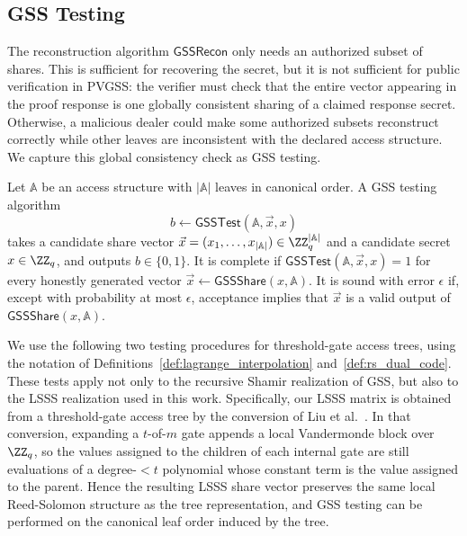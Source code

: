 \documentclass[runningheads]{llncs}
\newcommand{\gssshare}{\mathsf{GSSShare}}
\newcommand{\gssrecon}{\mathsf{GSSRecon}}
\newcommand{\gsstest}{\mathsf{GSSTest}}
\begin{document}



\subsection{GSS Testing}
The reconstruction algorithm \(\gssrecon\) only needs an authorized subset of shares. This is sufficient for recovering the secret, but it is not sufficient for public verification in PVGSS: the verifier must check that the entire vector appearing in the proof response is one globally consistent sharing of a claimed response secret. Otherwise, a malicious dealer could make some authorized subsets reconstruct correctly while other leaves are inconsistent with the declared access structure. We capture this global consistency check as GSS testing.

\begin{definition}\label{def:gss_testing}
Let \(\mathbb{A}\) be an access structure with \(|\mathbb{A}|\) leaves in canonical order. A GSS testing algorithm
\[
    b\gets \gsstest(\mathbb{A},\vec{x},x)
\]
takes a candidate share vector \(\vec{x}=(x_1,\ldots,x_{|\mathbb{A}|})\in \ZZ_q^{|\mathbb{A}|}\) and a candidate secret \(x\in\ZZ_q\), and outputs \(b\in\{0,1\}\). It is complete if \(\gsstest(\mathbb{A},\vec{x},x)=1\) for every honestly generated vector \(\vec{x}\gets \gssshare(x,\mathbb{A})\). It is sound with error \(\epsilon\) if, except with probability at most \(\epsilon\), acceptance implies that \(\vec{x}\) is a valid output of \(\gssshare(x,\mathbb{A})\).
\end{definition}

We use the following two testing procedures for threshold-gate access trees, using the notation of Definitions~\ref{def:lagrange_interpolation} and~\ref{def:rs_dual_code}. These tests apply not only to the recursive Shamir realization of GSS, but also to the LSSS realization used in this work. Specifically, our LSSS matrix is obtained from a threshold-gate access tree by the conversion of Liu et al.~\cite{Liu2010LSSS}. In that conversion, expanding a \(t\)-of-\(m\) gate appends a local Vandermonde block over \(\ZZ_q\), so the values assigned to the children of each internal gate are still evaluations of a degree-\(<t\) polynomial whose constant term is the value assigned to the parent. Hence the resulting LSSS share vector preserves the same local Reed-Solomon structure as the tree representation, and GSS testing can be performed on the canonical leaf order induced by the tree.
\end{document}
